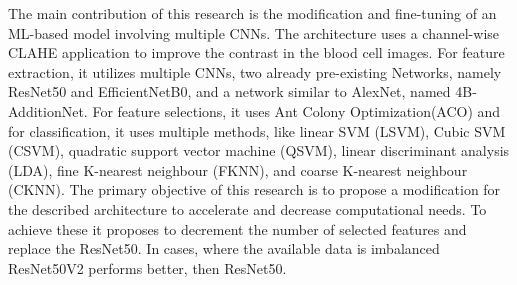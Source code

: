 The main contribution of this research is the modification and fine-tuning of an ML-based model involving multiple CNNs. The architecture uses a channel-wise CLAHE application to improve the contrast in the blood cell images. For feature extraction, it utilizes multiple CNNs, two already pre-existing Networks, namely ResNet50 and EfficientNetB0, and a network similar to AlexNet, named 4B-AdditionNet. For feature selections, it uses Ant Colony Optimization(ACO) and for classification, it uses multiple methods, like linear SVM (LSVM), Cubic SVM (CSVM), quadratic support vector machine (QSVM), linear discriminant analysis (LDA), fine K-nearest neighbour (FKNN), and coarse K-nearest neighbour (CKNN).
The primary objective of this research is to propose a modification for the described architecture to accelerate and decrease computational needs. To achieve these it proposes to decrement the number of selected features and replace the ResNet50. In cases, where the available data is imbalanced ResNet50V2 performs better, then ResNet50\cite{ResNet50V2Better}.
